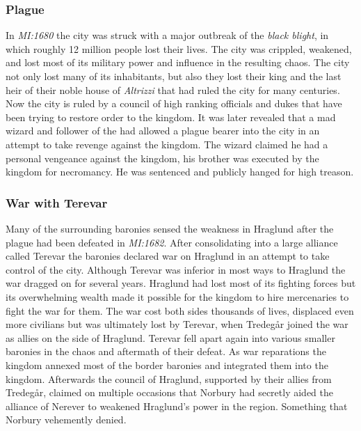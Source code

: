\subsubsection{Plague}
\label{sec:Plague of Hraglund}

In \emph{MI:1680} the city was struck with a major outbreak of the
\emph{black blight}, in which roughly 12 million people lost their lives. The
city was crippled, weakened, and lost most of its military power and influence
in the resulting chaos. The city not only lost many of its inhabitants, but
also they lost their king and the last heir of their noble house of
\emph{Altrizzi} that had ruled the city for many centuries. Now the city is
ruled by a council of high ranking officials and dukes that have been trying
to restore order to the kingdom. It was later revealed that a mad wizard and
follower of the  had allowed a plague bearer into the city
in an attempt to take revenge against the kingdom. The wizard claimed he had a
personal vengeance against the kingdom, his brother was executed by the
kingdom for necromancy. He was sentenced and publicly hanged for high treason.

\subsubsection*{War with Terevar}
\label{sec:Terevar}

Many of the surrounding baronies sensed the weakness in Hraglund after the
plague had been defeated in \emph{MI:1682}. After consolidating into a large
alliance called Terevar the baronies declared war on Hraglund in an attempt to
take control of the city. Although Terevar was inferior in most ways to
Hraglund the war dragged on for several years. Hraglund had lost most of its
fighting forces but its overwhelming wealth made it possible for the kingdom
to hire mercenaries to fight the war for them. The war cost both sides
thousands of lives, displaced even more civilians but was ultimately lost by
Terevar, when Tredegår joined the war as allies on the side of
Hraglund. Terevar fell apart again into various smaller baronies in the chaos
and aftermath of their defeat. As war reparations the kingdom annexed most of
the border baronies and integrated them into the kingdom. Afterwards the
council of Hraglund, supported by their allies from Tredegår, claimed on
multiple occasions that Norbury had secretly aided the alliance of Nerever to
weakened Hraglund's power in the region. Something that Norbury vehemently
denied.

